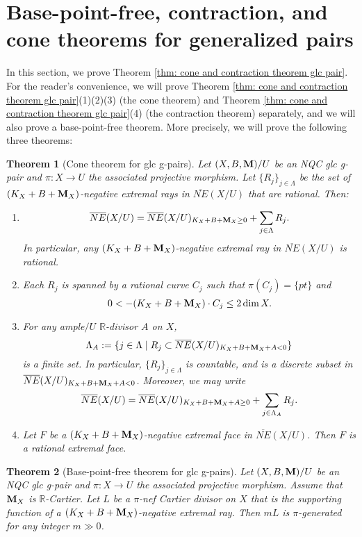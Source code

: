 \documentclass[11pt]{amsart}
\numberwithin{equation}{section}
\newcommand{\Mm}{{\bf{M}}}
\newcommand{\Rr}{\mathbb{R}}
\newtheorem{thm}{Theorem}[section]
\theoremstyle{definition}
\theoremstyle{definition}
\theoremstyle{definition}
\begin{document}
\section{Base-point-free, contraction, and cone theorems for generalized pairs}

In this section, we prove Theorem \ref{thm: cone and contraction theorem glc pair}. For the reader's convenience, we will prove Theorem \ref{thm: cone and contraction theorem glc pair}(1)(2)(3) (the cone theorem) and Theorem \ref{thm: cone and contraction theorem glc pair}(4) (the contraction theorem) separately, and we will also prove a base-point-free theorem. More precisely, we will prove the following three theorems:


\begin{thm}[Cone theorem for glc g-pairs]\label{thm: cone theorem glc g-pairs}
Let $(X,B,\Mm)/U$ be an NQC glc g-pair and $\pi: X\rightarrow U$ the associated projective morphism. Let $\{R_j\}_{j\in\Lambda}$ be the set of $(K_X+B+\Mm_X)$-negative extremal rays in $\overline{NE}(X/U)$ that are rational. Then:
\begin{enumerate}
    \item $$\overline{NE}(X/U)=\overline{NE}(X/U)_{K_X+B+\Mm_X\geq 0}+\sum_{j\in\Lambda}R_j.$$
    In particular, any $(K_X+B+\Mm_X)$-negative extremal ray in $\overline{NE}(X/U)$ is rational.
    \item Each $R_j$ is spanned by a rational curve $C_j$ such that $\pi(C_j)=\{pt\}$ and $$0<-(K_X+B+\Mm_X)\cdot C_j\leq 2\dim X.$$
    \item For any ample$/U$ $\Rr$-divisor $A$ on $X$,
    $$\Lambda_A:=\{j\in\Lambda\mid R_j\subset\overline{NE}(X/U)_{K_X+B+\Mm_X+A<0}\}$$
    is a finite set. In particular, $\{R_j\}_{j\in\Lambda}$ is countable, and is a discrete subset in $\overline{NE}(X/U)_{K_X+B+\Mm_X+A<0}$. Moreover, we may write
    $$\overline{NE}(X/U)=\overline{NE}(X/U)_{K_X+B+\Mm_X+A\geq 0}+\sum_{j\in\Lambda_A}R_j.$$
    \item Let $F$ be a $(K_X+B+\Mm_X)$-negative extremal face in $\overline{NE}(X/U)$. Then $F$ is a rational extremal face.
\end{enumerate}
\end{thm}


\begin{thm}[Base-point-free theorem for glc g-pairs]\label{thm: base-point-free theorem for glc pairs}
Let $(X,B,\Mm)/U$ be an NQC glc g-pair and $\pi: X\rightarrow U$ the associated projective morphism. Assume that $\Mm_X$ is $\Rr$-Cartier. Let $L$ be a $\pi$-nef Cartier divisor on $X$ that is the supporting function of a $(K_X+B+\Mm_X)$-negative extremal ray. Then $mL$ is $\pi$-generated for any integer $m\gg 0$.
\end{thm}
\end{document}
